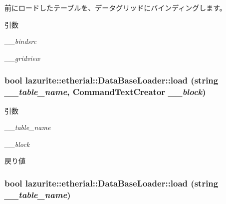 前にロードしたテーブルを、データグリッドにバインディングします。 
\begin{DoxyParams}{引数}
\item[{\em \_\-\_\-bindsrc}]\item[{\em \_\-\_\-gridview}]\end{DoxyParams}
\hypertarget{classlazurite_1_1etherial_1_1_data_base_loader_afbe7dcab9574865fb2e22d87e5649254}{
\subsubsection[{load}]{\setlength{\rightskip}{0pt plus 5cm}bool lazurite::etherial::DataBaseLoader::load (string {\em \_\-\_\-table\_\-name}, \/  CommandTextCreator {\em \_\-\_\-block})}}
\label{classlazurite_1_1etherial_1_1_data_base_loader_afbe7dcab9574865fb2e22d87e5649254}

\begin{DoxyParams}{引数}
\item[{\em \_\-\_\-table\_\-name}]\item[{\em \_\-\_\-block}]\end{DoxyParams}
\begin{DoxyReturn}{戻り値}

\end{DoxyReturn}
\hypertarget{classlazurite_1_1etherial_1_1_data_base_loader_a5f042af6f723cbf7f7b74a7d6290ba27}{
\subsubsection[{load}]{\setlength{\rightskip}{0pt plus 5cm}bool lazurite::etherial::DataBaseLoader::load (string {\em \_\-\_\-table\_\-name})}}
\label{classlazurite_1_1etherial_1_1_data_base_loader_a5f042af6f723cbf7f7b74a7d6290ba27}

